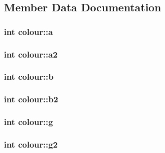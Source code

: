 \subsection{Member Data Documentation}
\hypertarget{structcolour_afb6afffbac43ce8fb1170b8650a9564d}{
\subsubsection[{a}]{\setlength{\rightskip}{0pt plus 5cm}int colour\-::a}}\label{structcolour_afb6afffbac43ce8fb1170b8650a9564d}
\hypertarget{structcolour_ad85be043df7822f3ad3fb949592b73f6}{
\subsubsection[{a2}]{\setlength{\rightskip}{0pt plus 5cm}int colour\-::a2}}\label{structcolour_ad85be043df7822f3ad3fb949592b73f6}
\hypertarget{structcolour_a5e4726c3fde32824d03c3f9beea39e24}{
\subsubsection[{b}]{\setlength{\rightskip}{0pt plus 5cm}int colour\-::b}}\label{structcolour_a5e4726c3fde32824d03c3f9beea39e24}
\hypertarget{structcolour_afcfbcb0958f36a5fa84c92a86a1a6cad}{
\subsubsection[{b2}]{\setlength{\rightskip}{0pt plus 5cm}int colour\-::b2}}\label{structcolour_afcfbcb0958f36a5fa84c92a86a1a6cad}
\hypertarget{structcolour_ab8abffbeaa8d24f16f61584215586ccf}{
\subsubsection[{g}]{\setlength{\rightskip}{0pt plus 5cm}int colour\-::g}}\label{structcolour_ab8abffbeaa8d24f16f61584215586ccf}
\hypertarget{structcolour_a0c38221b7aae8ec657f70be4f49517d9}{
\subsubsection[{g2}]{\setlength{\rightskip}{0pt plus 5cm}int colour\-::g2}}\label{structcolour_a0c38221b7aae8ec657f70be4f49517d9}
